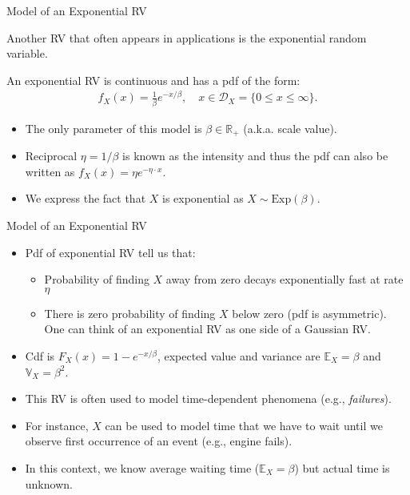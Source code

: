 \documentclass[9pt]{beamer}
\begin{document}
%
\begin{frame}{Model of an Exponential RV}

Another RV that often appears in applications is the exponential random variable.  

\begin{block}{}
An exponential RV is continuous and has a pdf of the form:
\begin{align*}
f_X(x)=\frac{1}{\beta}e^{-x/\beta},\quad x\in \mathcal{D}_X=\{0\leq x\leq \infty\}.
\end{align*}
\end{block}
\begin{itemize}
\setlength{\itemsep}{10pt}
\item The only parameter of this model is $\beta \in \mathbb{R}_+$ (a.k.a. scale value). 
\item Reciprocal $\eta=1/\beta$ is known as the intensity and thus the pdf can also be written as $f_X(x)=\eta e^{-\eta\cdot x}$. 
\item We express the fact that $X$ is exponential as $X\sim \textrm{Exp}(\beta)$.
\end{itemize}

\end{frame}

%
\begin{frame}{Model of an Exponential RV}

\begin{itemize}
\setlength{\itemsep}{10pt}
\item Pdf of exponential RV tell us that:

\begin{itemize} 
\setlength{\itemsep}{10pt}
\item Probability of finding $X$ away from zero decays exponentially fast at rate $\eta$
\item There is zero probability of finding $X$ below zero (pdf is asymmetric). One can think of an exponential RV as one side of a Gaussian RV. 
\end{itemize}
\item Cdf is $F_X(x)=1-e^{-x/\beta}$, expected value and variance are $\mathbb{E}_X=\beta$ and $\mathbb{V}_X=\beta^2$.
\item This RV is often used to model time-dependent phenomena (e.g., {\em failures}). 
\item For instance, $X$ can be used to model time that we have to wait until we observe first occurrence of an event (e.g., engine fails). 
\item In this context, we know average waiting time ($\mathbb{E}_X=\beta$) but actual time is unknown. 
\end{itemize}

\end{frame}
\end{document}
